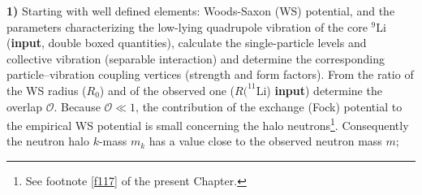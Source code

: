 \textbf{1)} Starting with well defined elements: Woods-Saxon (WS) potential, and the parameters characterizing the low-lying quadrupole vibration of the core $^{9}$Li (\textbf{input}, double boxed quantities), calculate the single-particle levels and collective vibration (separable interaction) and determine the corresponding particle--vibration coupling vertices (strength and form factors). From the ratio of the WS radius ($R_0$) and of the observed one ($R(^{11}$Li) \textbf{input}) determine the overlap $\mathcal O$. Because $\mathcal O\ll 1$, the contribution of the exchange (Fock) potential to the empirical WS potential is small concerning the halo neutrons\footnote{See footnote \ref{f117} of the present Chapter.}. Consequently the neutron halo $k$-mass $m_k$ has a value close to the observed neutron mass $m$;

